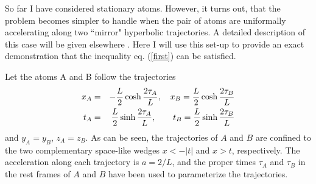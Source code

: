 \documentclass[12pt]{article}
\newcommand{\beqa}{\begin{eqnarray}}
\newcommand{\eeqa}{\end{eqnarray}}
\begin{document}
So far I have considered stationary atoms.
However, it turns out,
that the problem becomes simpler
to handle when the pair of atoms are uniformally accelerating
along two ``mirror" hyperbolic trajectories.
A detailed description of this case will be given elsewhere \cite{reznik}.
Here I will use this set-up to provide an
exact demonstration that the inequality eq. (\ref{first})
can be satisfied.

Let the atoms A and B follow the trajectories
\beqa
x_A &=& -{L\over2}\cosh{2\tau_A\over L}, \  \ \
    x_B= {L\over2} \cosh{2\tau_B\over L} \nonumber \\
t_A &=& {L\over2}\sinh{2\tau_A\over L}, \ \ \ \ \ \
t_B= {L\over2} \sinh{2\tau_B\over L}
\label{xt}
\eeqa
and $y_A=y_B$, $z_A=z_B$. As can be seen, the trajectories of
$A$ and $B$ are confined to the two complementary space-like wedges
$x< -|t|$ and $x>t$, respectively.
The acceleration along each trajectory is $a=2/L$, and
the proper times 
$\tau_A$ and $\tau_B$ in the rest frames of $A$ and $B$
have been used to parameterize
the trajectories.
\end{document}
